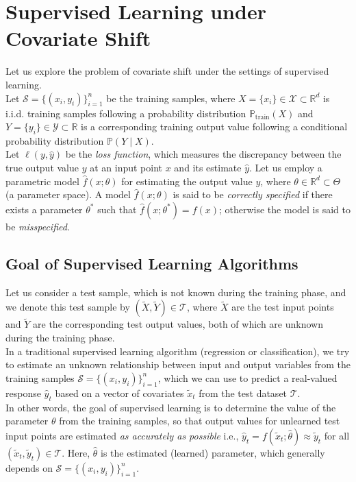 \chapter{Supervised Learning under Covariate Shift}\label{chp:4}

Let us explore the problem of covariate shift under the settings of supervised learning.\\

Let $\mathcal{S} = \{(x_i, y_i)\}_{i=1}^n$ be the training samples, where $X = \{x_i\} \in \mathcal{X} \subset \mathbb{R}^d$ is i.i.d. training samples following a probability distribution $\mathbb{P}_{\text{train}}(X)$ and $Y = \{y_i\} \in \mathcal{Y} \subset \mathbb{R}$ is a corresponding training output value following a conditional probability distribution $\mathbb{P}(Y \mid X)$.\\

Let $\ell(y, \hat{y})$ be the \emph{loss function}, which measures the discrepancy between the true output value $y$ at an input point $x$ and its estimate $\hat{y}$. Let us employ a parametric model $\hat{f}(x; \theta)$ for estimating the output value $y$, where $\theta \in \mathbb{R}^d \subset \Theta$ (a parameter space). A model $\hat{f}(x; \theta)$ is said to be \emph{correctly specified} if there exists a parameter $\theta^*$ such that $\hat{f}(x; \theta^*) = f(x)$; otherwise the model is said to be \emph{misspecified}.\\

\section{Goal of Supervised Learning Algorithms}
Let us consider a test sample, which is not known during the training phase, and we denote this test sample by $(\tilde{X}, \tilde{Y}) \in \mathcal{T}$, where $\tilde{X}$ are the test input points and $\tilde{Y}$ are the corresponding test output values, both of which are unknown during the training phase.\\

In a traditional supervised learning algorithm (regression or classification), we try to estimate an unknown relationship between input and output variables from the training samples $\mathcal{S} = \{(x_i, y_i)\}_{i=1}^n$, which we can use to predict a real-valued response $\hat{y}_t$ based on a vector of covariates $\tilde{x}_t$ from the test dataset $\mathcal{T}$.\\

In other words, the goal of supervised learning  is to determine the value of the parameter $\theta$ from the training samples, so that output values for unlearned test input points are estimated \emph{as accurately as possible} i.e., $\hat{y}_t = f(\tilde{x}_t;\hat{\theta}) \approx \tilde{y}_t$ for all $(\tilde{x}_t, \tilde{y}_t) \in \mathcal{T}$. Here, $\hat{\theta}$ is the estimated (learned) parameter, which generally depends on $\mathcal{S} = \{(x_i, y_i)\}_{i=1}^n$.\\

